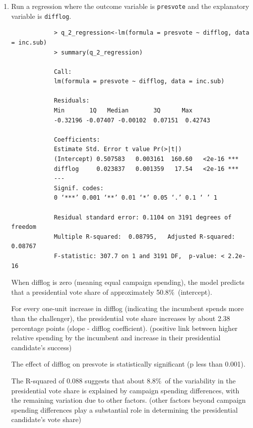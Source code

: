 \documentclass[12pt,letterpaper]{article}
\begin{document}
	\begin{enumerate}
		\item Run a regression where the outcome variable is \texttt{presvote} and the explanatory variable is \texttt{difflog}.	\\
		\begin{verbatim}
			> q_2_regression<-lm(formula = presvote ~ difflog, data = inc.sub)
			> summary(q_2_regression)
			
			Call:
			lm(formula = presvote ~ difflog, data = inc.sub)
			
			Residuals:
			Min       1Q   Median       3Q      Max 
			-0.32196 -0.07407 -0.00102  0.07151  0.42743 
			
			Coefficients:
			Estimate Std. Error t value Pr(>|t|)    
			(Intercept) 0.507583   0.003161  160.60   <2e-16 ***
			difflog     0.023837   0.001359   17.54   <2e-16 ***
			---
			Signif. codes:  
			0 ‘***’ 0.001 ‘**’ 0.01 ‘*’ 0.05 ‘.’ 0.1 ‘ ’ 1
			
			Residual standard error: 0.1104 on 3191 degrees of freedom
			Multiple R-squared:  0.08795,	Adjusted R-squared:  0.08767 
			F-statistic: 307.7 on 1 and 3191 DF,  p-value: < 2.2e-16
		\end{verbatim}
		When difflog is zero (meaning equal campaign spending), the model predicts that a presidential vote share of approximately 50.8\%\ (intercept).
		
		For every one-unit increase in difflog (indicating the incumbent spends more than the challenger), the presidential vote share increases by about 2.38 percentage points (slope - difflog coefficient). (positive link between higher relative spending by the incumbent and increase in their presidential candidate's success)
		
		The effect of difflog on presvote is statistically significant (p less than 0.001).
		
		The R-squared of 0.088 suggests that about 8.8\%\ of the variability in the presidential vote share is explained by campaign spending differences, with the remaining variation due to other factors. (other factors beyond campaign spending differences play a substantial role in determining the presidential candidate's vote share)
		

\end{enumerate}
\end{document}
